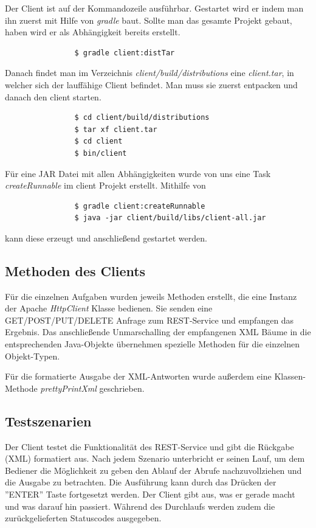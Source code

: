 \documentclass[12pt]{scrartcl}
\begin{document}
			Der Client ist auf der Kommandozeile ausführbar. Gestartet wird er indem man ihn zuerst mit Hilfe von \emph{gradle} baut. Sollte man das gesamte Projekt gebaut, haben wird er als Abhängigkeit bereits erstellt.
			\begin{verbatim}
				$ gradle client:distTar
			\end{verbatim}
			
			Danach findet man im Verzeichnis \emph{client/build/distributions} eine \emph{client.tar}, in welcher sich der lauffähige Client befindet. Man muss sie zuerst entpacken und danach den client starten.
			
			\begin{verbatim}
				$ cd client/build/distributions
				$ tar xf client.tar
				$ cd client
				$ bin/client
			\end{verbatim}
			
			Für eine JAR Datei mit allen Abhängigkeiten wurde von uns eine Task \emph{createRunnable} im client Projekt erstellt. Mithilfe von
			\begin{verbatim}
				$ gradle client:createRunnable
				$ java -jar client/build/libs/client-all.jar
			\end{verbatim}
			
			kann diese erzeugt und anschließend gestartet werden.
		\subsection{Methoden des Clients}
		
			Für die einzelnen Aufgaben wurden jeweils Methoden erstellt, die eine Instanz der Apache \emph{HttpClient} Klasse bedienen. Sie senden eine GET/POST/PUT/DELETE Anfrage zum REST-Service und empfangen das Ergebnis. Das anschließende Unmarschalling der empfangenen XML Bäume in die entsprechenden Java-Objekte übernehmen spezielle Methoden für die einzelnen Objekt-Typen.
			
			Für die formatierte Ausgabe der XML-Antworten wurde außerdem eine Klassen-Methode \emph{prettyPrintXml} geschrieben.
		
		
		\subsection{Testszenarien}
			
			Der Client testet die Funktionalität des REST-Service und gibt die Rückgabe (XML) formatiert aus. Nach jedem Szenario unterbricht er seinen Lauf, um dem Bediener die Möglichkeit zu geben den Ablauf der Abrufe nachzuvollziehen und die Ausgabe zu betrachten. Die Ausführung kann durch das Drücken der ''ENTER'' Taste fortgesetzt werden. Der Client gibt aus, was er gerade macht und was darauf hin passiert. Während des Durchlaufs werden zudem die zurückgelieferten Statuscodes ausgegeben.
			
\end{document}
